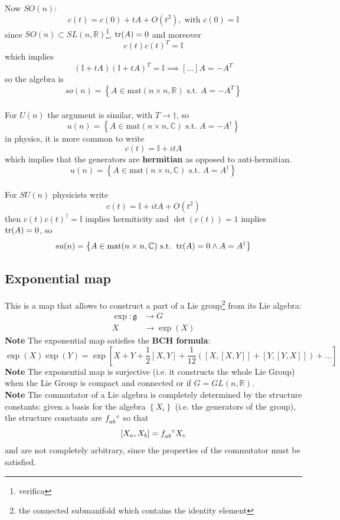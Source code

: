 Now $SO(n)$:
$$c(t) = c(0)+tA+O(t^2),\;\text{with }c(0)=\mathbb{I}$$
since $SO(n)\subset SL(n,\mathbb{R})$\footnote{verifica}, $\tr(A)=0$ and moreover
$$c(t)c(t)^T = \mathbb{I}$$
which implies
$$(\mathbb{I}+tA)(\mathbb{I}+tA)^T=\mathbb{I}\implies[...]A=-A^T$$
so the algebra is
$$so(n) = \left\{A\in\text{mat}(n\times n,\mathbb{R})\text{ s.t. }A=-A^T
\right\}$$\\

For $U(n)$ the argument is similar, with $T\to\dagger$, so
$$u(n)=\left\{A\in\text{mat}(n\times n,\mathbb{C})\text{ s.t. }A=-A^\dagger
\right\}$$
in physics, it is more common to write
$$c(t) = \mathbb{I}+itA$$
which implies that the generators are \textbf{hermitian} as opposed to 
anti-hermitian.
$$u(n)=\left\{A\in\text{mat}(n\times n,\mathbb{C})\text{ s.t. }A=A^\dagger
\right\}$$\\

For $SU(n)$ physicists write
$$c(t) = \mathbb{I} +itA +O(t^2)$$
then $c(t)c(t)^\dagger = \mathbb{I}$ implies hermiticity and $\det(c(t))=1$
implies $\tr(A)=0$, so
$$su(n) = \left\{A\in\text{mat}(n\times n,\mathbb{C})\text{ s.t. }\tr(A)=0\land
A=A^\dagger\right\}$$

\subsection{Exponential map}
This is a map that allows to construct a part of a Lie group\footnote{the
connected submanifold which contains the identity element} from its Lie algebra:
\begin{align*}
    \exp:\mathfrak{g}&\to G\\
                    X&\to\exp(X)
\end{align*}
\textbf{Note} The exponential map satisfies the \textbf{BCH formula}:
$$\exp(X)\exp(Y) = \exp\left[X+Y+\frac{1}{2}\left[X,Y\right]+\frac{1}{12}\left(
\left[X,\left[X,Y\right]\right] + \left[Y,\left[Y,X\right]\right]\right)+...\right]
$$
\textbf{Note} The exponential map is surjective (i.e. it constructs the whole
Lie Group) when the Lie Group is compact and connected or if $G=GL(n,\mathbb{R})$.
\\

\textbf{Note} The commutator of a Lie algebra is completely determined by
the structure constants: given a basis for the algebra $\left\{X_i\right\}$
(i.e. the generators of the group), the structure constants are $f\indices{_a
_b^c}$ so that
$$\left[X_a,X_b\right]=f\indices{_a_b^c}X_c$$
and are not completely arbitrary, since the properties of the commutator must
be satisfied.
